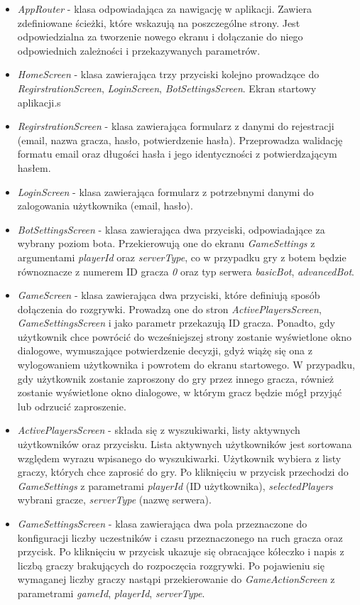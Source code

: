 \begin{itemize}
	\item \emph{AppRouter} - klasa odpowiadająca za nawigację w aplikacji. Zawiera zdefiniowane ścieżki, które wskazują na poszczególne strony. Jest odpowiedzialna za tworzenie nowego ekranu i dołączanie do niego odpowiednich zależności i przekazywanych parametrów.
	\item \emph{HomeScreen} - klasa zawierająca trzy przyciski kolejno prowadzące do \emph{RegirstrationScreen}, \emph{LoginScreen}, \emph{BotSettingsScreen}. Ekran startowy aplikacji.s
	\item \emph{RegirstrationScreen} - klasa zawierająca formularz z danymi do rejestracji (email, nazwa gracza, hasło, potwierdzenie hasła). Przeprowadza walidację formatu email oraz długości hasła i jego identyczności z potwierdzającym hasłem.
	\item \emph{LoginScreen} - klasa zawierająca formularz z potrzebnymi danymi do zalogowania użytkownika (email, hasło).
	\item \emph{BotSettingsScreen} - klasa zawierająca dwa przyciski, odpowiadające za wybrany poziom bota. Przekierowują one do ekranu \emph{GameSettings} z argumentami \emph{playerId} oraz \emph{serverType}, co w przypadku gry z botem będzie równoznacze z numerem ID gracza \emph{0} oraz typ serwera \emph{basicBot}, \emph{advancedBot}.
	\item \emph{GameScreen} - klasa zawierająca dwa przyciski, które definiują sposób dołączenia do rozgrywki. Prowadzą one do stron \emph{ActivePlayersScreen}, \emph{GameSettingsScreen} i jako parametr przekazują ID gracza. Ponadto, gdy użytkownik chce powrócić do wcześniejszej strony zostanie wyświetlone okno dialogowe, wymuszające potwierdzenie decyzji, gdyż wiążę się ona z wylogowaniem użytkownika i powrotem do ekranu startowego. W przypadku, gdy użytkownik zostanie zaproszony do gry przez innego gracza, również zostanie wyświetlone okno dialogowe, w którym gracz będzie mógł przyjąć lub odrzucić zaproszenie.
	\item \emph{ActivePlayersScreen} - składa się z wyszukiwarki, listy aktywnych użytkowników oraz przycisku. Lista aktywnych użytkowników jest sortowana względem wyrazu wpisanego do wyszukiwarki. Użytkownik wybiera z listy graczy, których chce zaprosić do gry. Po kliknięciu w przycisk przechodzi do \emph{GameSettings} z parametrami \emph{playerId} (ID użytkownika), \emph{selectedPlayers} wybrani gracze, \emph{serverType} (nazwę serwera).
	\item \emph{GameSettingsScreen} - klasa zawierająca dwa pola przeznaczone do konfiguracji liczby uczestników i czasu przeznaczonego na ruch gracza oraz przycisk. Po kliknięciu w przycisk ukazuje się obracające kółeczko i napis z liczbą graczy brakujących do rozpoczęcia rozgrywki. Po pojawieniu się wymaganej liczby graczy nastąpi przekierowanie do \emph{GameActionScreen} z parametrami \emph{gameId}, \emph{playerId}, \emph{serverType}.

\end{itemize}
